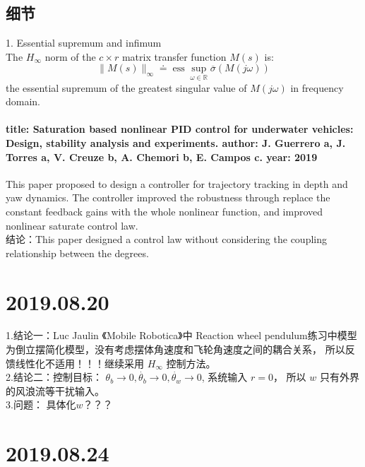 \documentclass[UTF8,a4paper]{ctexart}
\begin{document}
\subsection{细节}
1. Essential supremum and infimum \\
The $H_\infty$ norm of the $c \times r$ matrix transfer function $M(s)$ is: 
\begin{equation}
\|M(s)\|_{\infty} \doteq \operatorname{ess} \sup _{\omega \in \mathbb{R}} \overline{\sigma}(M(j \omega))
\end{equation}
the essential supremum of the greatest singular value of $M(j \omega)$ in frequency domain.
\paragraph{title: Saturation based nonlinear PID control for underwater vehicles: Design,
stability analysis and experiments.  author: J. Guerrero a, J. Torres a, V. Creuze b, A. Chemori b, E. Campos c.  year: 2019}
This paper proposed to design a controller for trajectory tracking in depth and yaw dynamics. The controller improved the robustness through replace the constant feedback gains with the whole nonlinear function, and improved nonlinear saturate control law.\\
结论：This paper designed a control law without considering the coupling relationship between the degrees.\\
\section{2019.08.20}
1.结论一：Luc Jaulin 《Mobile Robotica》中 Reaction wheel pendulum练习中模型为倒立摆简化模型，没有考虑摆体角速度和飞轮角速度之间的耦合关系， 所以反馈线性化不适用！！！继续采用 $H_\infty$ 控制方法。\\
2.结论二：控制目标： $\theta_b \rightarrow 0, \dot{\theta_b} \rightarrow 0, \dot{\theta_w} \rightarrow 0$, 系统输入 $r = 0$， 所以 $w$ 只有外界的风浪流等干扰输入。\\
3.问题： 具体化$w$？？？\\
\section{2019.08.24}
\end{document}
